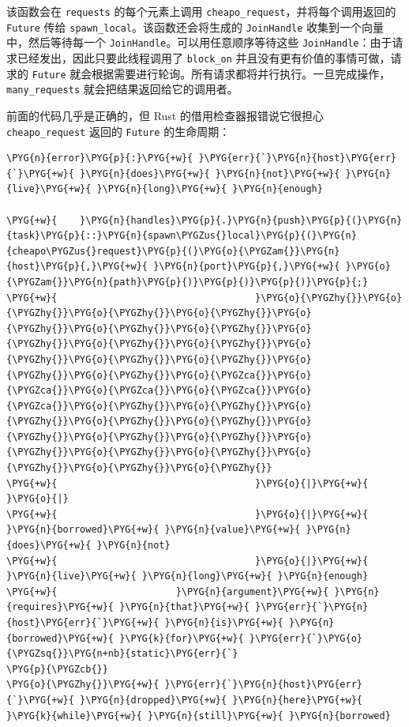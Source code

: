 该函数会在 \texttt{requests} 的每个元素上调用 \texttt{cheapo\_request}，并将每个调用返回的 \texttt{Future} 传给 \texttt{spawn\_local}。该函数还会将生成的 \texttt{JoinHandle} 收集到一个向量中，然后等待每一个 \texttt{JoinHandle}。可以用任意顺序等待这些 \texttt{JoinHandle}：由于请求已经发出，因此只要此线程调用了 \texttt{block\_on} 并且没有更有价值的事情可做，请求的 \texttt{Future} 就会根据需要进行轮询。所有请求都将并行执行。一旦完成操作，\texttt{many\_requests} 就会把结果返回给它的调用者。

前面的代码几乎是正确的，但 Rust 的借用检查器报错说它很担心 \texttt{cheapo\_request} 返回的 \texttt{Future} 的生命周期：

\begin{Verbatim}[commandchars=\\\{\},breaklines=true,breakanywhere=true,fontsize=\codefont,xleftmargin=17bp]
\PYG{n}{error}\PYG{p}{:}\PYG{+w}{ }\PYG{err}{`}\PYG{n}{host}\PYG{err}{`}\PYG{+w}{ }\PYG{n}{does}\PYG{+w}{ }\PYG{n}{not}\PYG{+w}{ }\PYG{n}{live}\PYG{+w}{ }\PYG{n}{long}\PYG{+w}{ }\PYG{n}{enough}

\PYG{+w}{    }\PYG{n}{handles}\PYG{p}{.}\PYG{n}{push}\PYG{p}{(}\PYG{n}{task}\PYG{p}{::}\PYG{n}{spawn\PYGZus{}local}\PYG{p}{(}\PYG{n}{cheapo\PYGZus{}request}\PYG{p}{(}\PYG{o}{\PYGZam{}}\PYG{n}{host}\PYG{p}{,}\PYG{+w}{ }\PYG{n}{port}\PYG{p}{,}\PYG{+w}{ }\PYG{o}{\PYGZam{}}\PYG{n}{path}\PYG{p}{)}\PYG{p}{)}\PYG{p}{)}\PYG{p}{;}
\PYG{+w}{                                   }\PYG{o}{\PYGZhy{}}\PYG{o}{\PYGZhy{}}\PYG{o}{\PYGZhy{}}\PYG{o}{\PYGZhy{}}\PYG{o}{\PYGZhy{}}\PYG{o}{\PYGZhy{}}\PYG{o}{\PYGZhy{}}\PYG{o}{\PYGZhy{}}\PYG{o}{\PYGZhy{}}\PYG{o}{\PYGZhy{}}\PYG{o}{\PYGZhy{}}\PYG{o}{\PYGZhy{}}\PYG{o}{\PYGZhy{}}\PYG{o}{\PYGZhy{}}\PYG{o}{\PYGZhy{}}\PYG{o}{\PYGZca{}}\PYG{o}{\PYGZca{}}\PYG{o}{\PYGZca{}}\PYG{o}{\PYGZca{}}\PYG{o}{\PYGZca{}}\PYG{o}{\PYGZhy{}}\PYG{o}{\PYGZhy{}}\PYG{o}{\PYGZhy{}}\PYG{o}{\PYGZhy{}}\PYG{o}{\PYGZhy{}}\PYG{o}{\PYGZhy{}}\PYG{o}{\PYGZhy{}}\PYG{o}{\PYGZhy{}}\PYG{o}{\PYGZhy{}}\PYG{o}{\PYGZhy{}}\PYG{o}{\PYGZhy{}}\PYG{o}{\PYGZhy{}}\PYG{o}{\PYGZhy{}}\PYG{o}{\PYGZhy{}}
\PYG{+w}{                                   }\PYG{o}{|}\PYG{+w}{              }\PYG{o}{|}
\PYG{+w}{                                   }\PYG{o}{|}\PYG{+w}{              }\PYG{n}{borrowed}\PYG{+w}{ }\PYG{n}{value}\PYG{+w}{ }\PYG{n}{does}\PYG{+w}{ }\PYG{n}{not}
\PYG{+w}{                                   }\PYG{o}{|}\PYG{+w}{              }\PYG{n}{live}\PYG{+w}{ }\PYG{n}{long}\PYG{+w}{ }\PYG{n}{enough}
\PYG{+w}{                     }\PYG{n}{argument}\PYG{+w}{ }\PYG{n}{requires}\PYG{+w}{ }\PYG{n}{that}\PYG{+w}{ }\PYG{err}{`}\PYG{n}{host}\PYG{err}{`}\PYG{+w}{ }\PYG{n}{is}\PYG{+w}{ }\PYG{n}{borrowed}\PYG{+w}{ }\PYG{k}{for}\PYG{+w}{ }\PYG{err}{`}\PYG{o}{\PYGZsq{}}\PYG{n+nb}{static}\PYG{err}{`}
\PYG{p}{\PYGZcb{}}
\PYG{o}{\PYGZhy{}}\PYG{+w}{ }\PYG{err}{`}\PYG{n}{host}\PYG{err}{`}\PYG{+w}{ }\PYG{n}{dropped}\PYG{+w}{ }\PYG{n}{here}\PYG{+w}{ }\PYG{k}{while}\PYG{+w}{ }\PYG{n}{still}\PYG{+w}{ }\PYG{n}{borrowed}
\end{Verbatim}

